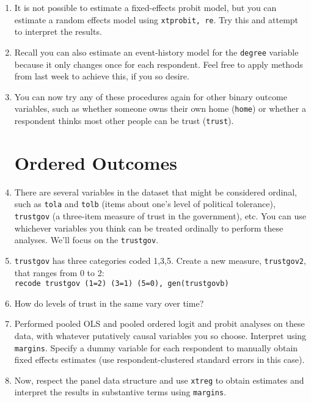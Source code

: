 \documentclass[a4paper,12pt]{article}
\begin{document}
\begin{enumerate}
\item It is not possible to estimate a fixed-effects probit model, but you can estimate a random effects model using \texttt{xtprobit, re}. Try this and attempt to interpret the results.

\item Recall you can also estimate an event-history model for the \texttt{degree} variable because it only changes once for each respondent. Feel free to apply methods from last week to achieve this, if you so desire.

\item You can now try any of these procedures again for other binary outcome variables, such as whether someone owns their own home (\texttt{home}) or whether a respondent thinks most other people can be trust (\texttt{trust}).

\section{Ordered Outcomes}

\item There are several variables in the dataset that might be considered ordinal, such as \texttt{tola} and \texttt{tolb} (items about one's level of political tolerance), \texttt{trustgov} (a three-item measure of trust in the government), etc. You can use whichever variables you think can be treated ordinally to perform these analyses. We'll focus on the \texttt{trustgov}.

\item \texttt{trustgov} has three categories coded 1,3,5. Create a new measure, \texttt{trustgov2}, that ranges from 0 to 2:\\
\texttt{recode trustgov (1=2) (3=1) (5=0), gen(trustgovb)}

\item How do levels of trust in the same vary over time?

\item Performed pooled OLS and pooled ordered logit and probit analyses on these data, with whatever putatively causal variables you so choose. Interpret using \texttt{margins}. Specify a dummy variable for each respondent to manually obtain fixed effects estimates (use respondent-clustered standard errors in this case).

\item Now, respect the panel data structure and use \texttt{xtreg} to obtain estimates and interpret the results in substantive terms using \texttt{margins}.


\end{enumerate}
\end{document}
